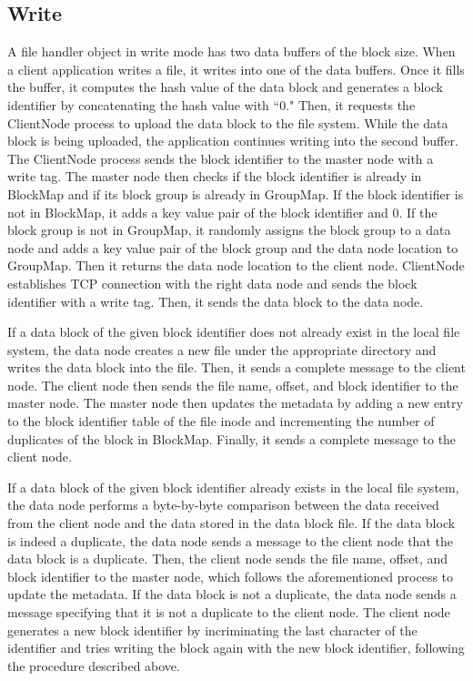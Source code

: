 \documentclass[11pt,twocolumn]{article}
\begin{document}
\subsection{Write}\label{ops:write}
A file handler object in write mode has two data buffers of the block size. When a client application writes a file, it writes into one of the data buffers. Once it fills the buffer, it computes the hash value of the data block and generates a block identifier by concatenating the hash value with ``0." Then, it requests the ClientNode process to upload the data block to the file system. While the data block is being uploaded, the application continues writing into the second buffer. The ClientNode process sends the block identifier to the master node with a write tag. The master node then checks if the block identifier is already in BlockMap and if its block group is already in GroupMap. If the block identifier is not in BlockMap, it adds a key value pair of the block identifier and 0. If the block group is not in GroupMap, it randomly assigns the block group to a data node and adds a key value pair of the block group and the data node location to GroupMap. Then it returns the data node location to the client node. ClientNode establishes TCP connection with the right data node and sends the block identifier with a write tag. Then, it sends the data block to the data node.

If a data block of the given block identifier does not already exist in the local file system, the data node creates a new file under the appropriate directory and writes the data block into the file. Then, it sends a complete message to the client node. The client node then sends the file name, offset, and block identifier to the master node.  The master node then updates the metadata by adding a new entry to the block identifier table of the file inode and incrementing the number of duplicates of the block in BlockMap. Finally, it sends a complete message to the client node.       

If a data block of the given block identifier already exists in the local file system, the data node performs a byte-by-byte comparison between the data received from the client node and the data stored in the data block file. If the data block is indeed a duplicate, the data node sends a message to the client node that the data block is a duplicate. Then, the client node sends the file name, offset, and block identifier to the master node, which follows the aforementioned process to update the metadata. If the data block is not a duplicate, the data node sends a message specifying that it is not a duplicate to the client node. The client node generates a new block identifier by incriminating the last character of the identifier and tries writing the block again with the new block identifier, following the procedure described above. 
\end{document}
